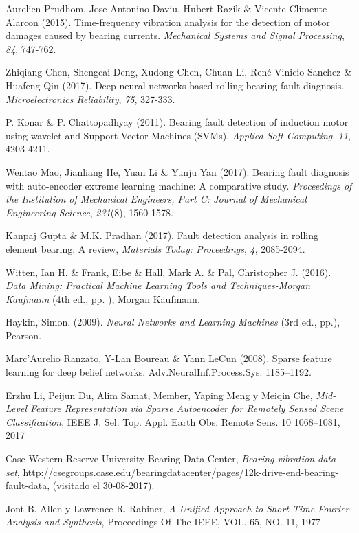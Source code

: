 \documentclass[12pt]{article}%
\begin{document}
\begin{thebibliography}{9}
 Aurelien Prudhom, Jose Antonino-Daviu, Hubert Razik \& Vicente Climente-Alarcon (2015). Time-frequency vibration analysis for the detection of motor damages caused by bearing currents. \textit{Mechanical Systems and Signal Processing}, \textit{84}, 747-762.

 Zhiqiang Chen, Shengcai Deng, Xudong Chen, Chuan Li, René-Vinicio Sanchez \& Huafeng Qin (2017). Deep neural networks-based rolling bearing fault diagnosis. \textit{Microelectronics Reliability}, \textit{75}, 327-333.

 P. Konar \& P. Chattopadhyay (2011). Bearing fault detection of induction motor using wavelet and Support Vector Machines (SVMs). \textit{Applied Soft Computing}, \textit{11}, 4203-4211.

 Wentao Mao, Jianliang He, Yuan Li \& Yunju Yan (2017). Bearing fault diagnosis with auto-encoder extreme learning machine: A comparative study. \textit{Proceedings of the Institution of Mechanical Engineers, Part C: Journal of Mechanical Engineering Science}, \textit{231}(8), 1560-1578.

 Kanpaj Gupta \& M.K. Pradhan (2017). Fault detection analysis in rolling element bearing: A review, \textit{Materials Today: Proceedings}, \textit{4}, 2085-2094.

 Witten, Ian H. \& Frank, Eibe \& Hall, Mark A. \& Pal, Christopher J. (2016). \textit{Data Mining: Practical Machine Learning Tools and Techniques-Morgan Kaufmann} (4th ed., pp. ), Morgan Kaufmann.

 Haykin, Simon. (2009). \textit{Neural Networks and Learning Machines} (3rd ed., pp.), Pearson.

 Marc’Aurelio Ranzato, Y-Lan Boureau \& Yann LeCun (2008). Sparse feature learning for deep belief networks. Adv.NeuralInf.Process.Sys. 1185–1192.

Erzhu Li, Peijun Du, Alim Samat, Member, Yaping Meng y Meiqin Che, \textit{Mid-Level Feature Representation via Sparse Autoencoder for Remotely Sensed Scene Classification}, IEEE J. Sel. Top. Appl. Earth Obs. Remote Sens. 10 1068–1081, 2017

Case Western Reserve University Bearing Data Center, \textit{Bearing vibration data set}, http://csegroups.case.edu/bearingdatacenter/pages/12k-drive-end-bearing-fault-data, (visitado el 30-08-2017).

Jont B. Allen y Lawrence R. Rabiner, \textit{A Unified Approach to Short-Time Fourier Analysis
and Synthesis}, Proceedings Of The IEEE, VOL. 65, NO. 11, 1977


\end{thebibliography}
\end{document}
